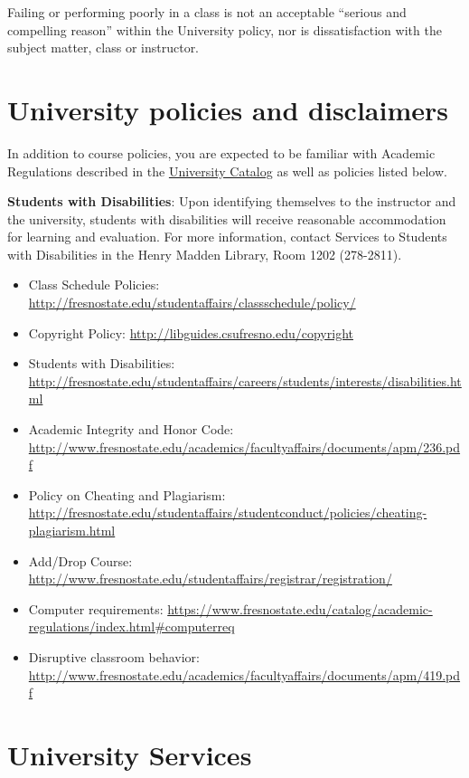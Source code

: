 Failing or performing poorly in a class is not an acceptable ``serious
and compelling reason'' within the University policy, nor is
dissatisfaction with the subject matter, class or instructor.

\hypertarget{university-policies-and-disclaimers}{%
\section{University policies and
disclaimers}\label{university-policies-and-disclaimers}}

In addition to course policies, you are expected to be familiar with
Academic Regulations described in the
\href{http://www.fresnostate.edu/catalog/academic-regulations/}{University
Catalog} as well as policies listed below.

\textbf{Students with Disabilities}: Upon identifying themselves to the
instructor and the university, students with disabilities will receive
reasonable accommodation for learning and evaluation. For more
information, contact Services to Students with Disabilities in the Henry
Madden Library, Room 1202 (278-2811).

\begin{itemize}
\tightlist
\item
  Class Schedule Policies:
  \url{http://fresnostate.edu/studentaffairs/classschedule/policy/}
\item
  Copyright Policy: \url{http://libguides.csufresno.edu/copyright}
\item
  Students with Disabilities:
  \url{http://fresnostate.edu/studentaffairs/careers/students/interests/disabilities.html}
\item
  Academic Integrity and Honor Code:
  \url{http://www.fresnostate.edu/academics/facultyaffairs/documents/apm/236.pdf}
\item
  Policy on Cheating and Plagiarism:
  \url{http://fresnostate.edu/studentaffairs/studentconduct/policies/cheating-plagiarism.html}
\item
  Add/Drop Course:
  \url{http://www.fresnostate.edu/studentaffairs/registrar/registration/}
\item
  Computer requirements:
  \url{https://www.fresnostate.edu/catalog/academic-regulations/index.html\#computerreq}
\item
  Disruptive classroom behavior:
  \url{http://www.fresnostate.edu/academics/facultyaffairs/documents/apm/419.pdf}
\end{itemize}

\hypertarget{university-services}{%
\section{University Services}\label{university-services}}

